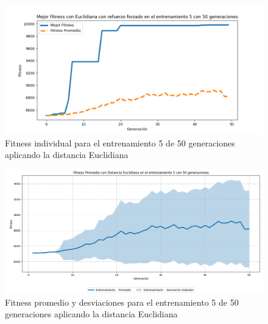\documentclass[conference]{IEEEtran}
\begin{document}
\begin{figure}[H]
    \centering
    \includegraphics[width=0.9 \linewidth]{Euclidiana/Fitnes_individual/Fitness_5_Eucli_50Gen.png}
    \caption{Fitness individual para el entrenamiento 5 de 50 generaciones aplicando la distancia Euclidiana}
    \label{fig:eucli_5_50}
\end{figure}
\begin{figure}[H]
    \centering
    \includegraphics[width=0.9 \linewidth]{Euclidiana/Fitnes_individual/Fitness_5_Eucli_50Gen_Sombra.png}
    \caption{Fitness promedio y desviaciones para el entrenamiento 5 de 50 generaciones aplicando la distancia Euclidiana}
    \label{fig:eucli_5_50_sombra}
\end{figure}
\end{document}
